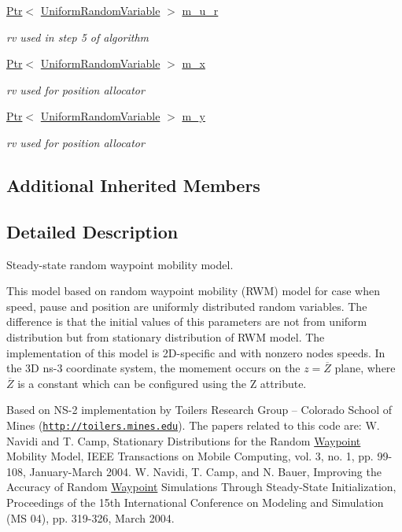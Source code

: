 \begin{DoxyCompactItemize}
\hyperlink{classns3_1_1Ptr}{Ptr}$<$ \hyperlink{classns3_1_1UniformRandomVariable}{Uniform\+Random\+Variable} $>$ \hyperlink{classns3_1_1SteadyStateRandomWaypointMobilityModel_a08d9ee8057dda08d1bd8ea696fd099c8}{m\+\_\+u\+\_\+r}
\begin{DoxyCompactList}\small\item\em rv used in step 5 of algorithm \end{DoxyCompactList}\item 
\hyperlink{classns3_1_1Ptr}{Ptr}$<$ \hyperlink{classns3_1_1UniformRandomVariable}{Uniform\+Random\+Variable} $>$ \hyperlink{classns3_1_1SteadyStateRandomWaypointMobilityModel_ab1524438e74aa8e648c5e03f2d1bf85c}{m\+\_\+x}
\begin{DoxyCompactList}\small\item\em rv used for position allocator \end{DoxyCompactList}\item 
\hyperlink{classns3_1_1Ptr}{Ptr}$<$ \hyperlink{classns3_1_1UniformRandomVariable}{Uniform\+Random\+Variable} $>$ \hyperlink{classns3_1_1SteadyStateRandomWaypointMobilityModel_a59fec0567f9834913a50f0d697cf409b}{m\+\_\+y}
\begin{DoxyCompactList}\small\item\em rv used for position allocator \end{DoxyCompactList}\end{DoxyCompactItemize}
\subsection*{Additional Inherited Members}


\subsection{Detailed Description}
Steady-\/state random waypoint mobility model. 

This model based on random waypoint mobility (R\+WM) model for case when speed, pause and position are uniformly distributed random variables. The difference is that the initial values of this parameters are not from uniform distribution but from stationary distribution of R\+WM model. The implementation of this model is 2\+D-\/specific and with nonzero nodes speeds. In the 3D ns-\/3 coordinate system, the momement occurs on the $ z=\overline{Z} $ plane, where $ \overline{Z} $ is a constant which can be configured using the Z attribute.

Based on N\+S-\/2 implementation by Toilers Research Group -- Colorado School of Mines (\href{http://toilers.mines.edu}{\tt http\+://toilers.\+mines.\+edu}). The papers related to this code are\+: W. Navidi and T. Camp, Stationary Distributions for the Random \hyperlink{classns3_1_1Waypoint}{Waypoint} Mobility Model, I\+E\+EE Transactions on Mobile Computing, vol. 3, no. 1, pp. 99-\/108, January-\/\+March 2004. W. Navidi, T. Camp, and N. Bauer, Improving the Accuracy of Random \hyperlink{classns3_1_1Waypoint}{Waypoint} Simulations Through Steady-\/\+State Initialization, Proceedings of the 15th International Conference on Modeling and Simulation (MS \textquotesingle{}04), pp. 319-\/326, March 2004. 

